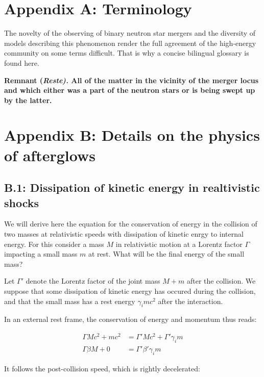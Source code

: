\section*{Appendix A: Terminology}

The novelty of the observing of binary neutron star mergers and the diversity of models describing this phenomenon render the full  agreement of the high-energy community on some terms difficult. That is why a concise bilingual glossary is found here.

\bf{Remnant (\it{Reste}). }All of the matter in the vicinity of the merger locus and which either was a part of the neutron stars or is being swept up by the latter.



\section*{Appendix B: Details on the physics of afterglows}
\subsection*{B.1: Dissipation of kinetic energy in realtivistic shocks}

We will derive here the equation for the conservation of energy in the collision of two masses at relativistic speeds with dissipation of kinetic enrgy to internal energy. For this consider a mass $M$ in relativistic motion at a Lorentz factor $\Gamma$ impacting a small mass $m$ at rest. What will be the final energy of the small mass?

Let $\Gamma'$ denote the Lorentz factor of the joint mass $M + m$ after the collision. We suppose that some dissipation of kinetic energy has occured during the collision, and that the small mass has a rest energy $\gamma_i m c^2$ after the interaction.

In an external rest frame, the conservation of energy and momentum thus reads:

\begin{align}
    \Gamma Mc^2 + mc^2 &= \Gamma' Mc^2 + \Gamma' \gamma_i m \\
    \Gamma \beta M + 0 &= \Gamma' \beta' \gamma_i m
\end{align}

It follows the post-collision speed, which is rightly decelerated:

